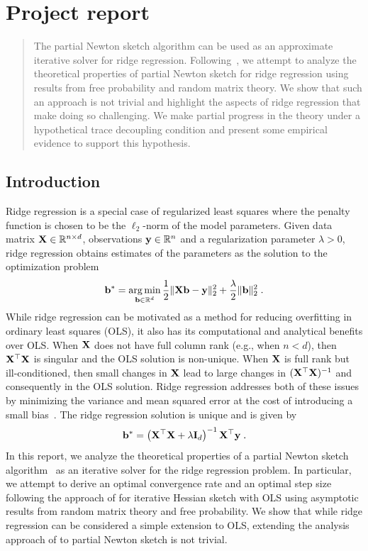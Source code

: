 

\section{Project report}


\begin{abstract}
The partial Newton sketch algorithm can be used as an approximate iterative solver for ridge regression. Following~\citet{Lacotte:2020}, we attempt to analyze the theoretical properties of partial Newton sketch for ridge regression using results from free probability and random matrix theory. We show that such an approach is not trivial and highlight the aspects of ridge regression that make doing so challenging. We make partial progress in the theory under a hypothetical trace decoupling condition and present some empirical evidence to support this hypothesis.
\end{abstract}


\subsection{Introduction}

Ridge regression is a special case of regularized least squares where the penalty function is chosen to be the $\ell_2$-norm of the model parameters. Given data matrix $\mathbf{X}\in\mathbb{R}^{n\times d}$, observations $\mathbf{y}\in\mathbb{R}^n$ and a regularization parameter $\lambda>0$, ridge regression obtains estimates of the parameters as the solution to the optimization problem
\[
\mathbf{b}^* = \operatorname*{arg\,min}_{\mathbf{b}\in\mathbb{R}^d} \frac{1}{2}\|\mathbf{X}\mathbf{b}-\mathbf{y}\|_2^2 + \frac{\lambda}{2}\|\mathbf{b}\|_2^2 \;.
\]
While ridge regression can be motivated as a method for reducing overfitting in ordinary least squares (OLS), it also has its computational and analytical benefits over OLS. When $\mathbf{X}$ does not have full column rank (e.g., when $n< d$), then $\mathbf{X}^\top\mathbf{X}$ is singular and the OLS solution is non-unique. When $\mathbf{X}$ is full rank but ill-conditioned, then small changes in $\mathbf{X}$ lead to large changes in $(\mathbf{X}^\top\mathbf{X})^{-1}$ and consequently in the OLS solution. Ridge regression addresses both of these issues by minimizing the variance and mean squared error at the cost of introducing a small bias~\citep{Chowdhury:2018}. The ridge regression solution is unique and is given by
\[
\mathbf{b}^* = \left(\mathbf{X}^\top\mathbf{X} + \lambda\mathbf{I}_d\right)^{-1}\mathbf{X}^\top\mathbf{y} \;.
\]
In this report, we analyze the theoretical properties of a partial Newton sketch algorithm~\citep{Pilanci:2017} as an iterative solver for the ridge regression problem. In particular, we attempt to derive an optimal convergence rate and an optimal step size following the approach of \citet{Lacotte:2020} for iterative Hessian sketch with OLS using asymptotic results from random matrix theory and free probability. We show that while ridge regression can be considered a simple extension to OLS, extending the analysis approach of \citet{Lacotte:2020} to partial Newton sketch is not trivial.
\\

